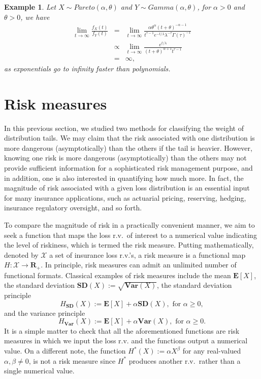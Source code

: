 \documentclass[12pt]{article}
\newtheorem{example}{\bf Example}
\begin{document}
\begin{example}
 Let $X\sim Pareto(\alpha, \theta)$ and $Y\sim Gamma(\alpha, \theta)$, for $\alpha>0$ and $\theta>0$, we have
\begin{eqnarray*}
    \lim_{t\to \infty} \frac{f_{X}(t)}{f_{Y}(t)} &=& \lim_{t \to \infty} \frac{\alpha \theta^{\alpha} (t+ \theta)^{-\alpha-1}}{t^{\tau-1} e^{-t/\lambda} \lambda^{-\tau} \Gamma(\tau)^{-1}} \\
 &\propto&  \lim_{t\to \infty} \frac{e^{t/\lambda}}{(t+\theta)^{\alpha+1} t^{\tau-1}} \\
    &=& \infty,\end{eqnarray*}
as exponentials go to infinity faster than polynomials.

\end{example}

\section{Risk measures}
In this previous section, we studied two methods for classifying the weight of distribution tails.  We may claim that the risk associated with one distribution is more dangerous (asymptotically) than the others if the tail is heavier.  However, knowing one risk is more dangerous (asymptotically) than the others may not provide sufficient information for a sophisticated risk management purpose, and in addition, one is also interested in quantifying how much more. In fact, the magnitude of risk associated with a given loss distribution is an essential input for many insurance applications, such as actuarial pricing, reserving, hedging, insurance regulatory oversight, and so forth.

To compare the magnitude of risk in a practically convenient manner, we aim to seek a function that maps the loss r.v.\ of interest to a numerical value indicating the level of riskiness, which is termed the risk measure.  Putting mathematically, denoted by $\mathcal{X}$ a set of insurance loss r.v.'s, a risk measure is a functional map $H:\mathcal{X}\rightarrow \mathbf{R}_+$.  In principle, risk measures can admit an unlimited number of functional formats.  Classical examples of risk measures include the mean $\mathbf{E}[X]$, the standard deviation $\mathbf{SD}(X):=\sqrt{\mathbf{Var}(X)}$, the standard deviation principle
\begin{equation}\label{eqn:SD-principle}
H_{\mathbf{SD}}(X):=\mathbf{E}[X]+\alpha \mathbf{SD}(X),\text{ for } \alpha\geq 0,
\end{equation}
and the variance principle
\[
H_{\mathbf{Var}}(X):=\mathbf{E}[X]+\alpha \mathbf{Var}(X),\text{ for } \alpha\geq 0.
\]
It is a simple matter to check that all the aforementioned functions are risk measures in which we input the loss r.v. and the functions output a numerical value.  On a different note, the function $H^{\ast}(X):=\alpha X^{\beta}$ for any real-valued $\alpha,\beta\neq 0$, is not a risk measure since $H^{\ast}$ produces another r.v.\ rather than a single numerical value.
\end{document}
